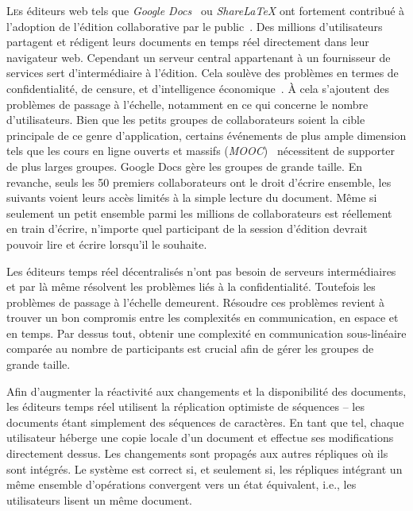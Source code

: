 
\lettrine{L}es éditeurs web tels que \emph{Google Docs}~\cite{googledocs} ou
\emph{ShareLaTeX}\cite{sharelatex} ont fortement contribué à l'adoption de
l'édition collaborative par le public~\cite{mogan2010impact}. Des millions
d'utilisateurs partagent et rédigent leurs documents en temps réel directement
dans leur navigateur web. Cependant un serveur central appartenant à un
fournisseur de services sert d'intermédiaire à l'édition. Cela soulève des
problèmes en termes de confidentialité, de censure, et d'intelligence
économique~\cite{cherrueau2016composer, gellman2013us, pearson2011toward}. À
cela s'ajoutent des problèmes de passage à l'échelle, notamment en ce qui
concerne le nombre d'utilisateurs. Bien que les petits groupes de collaborateurs
soient la cible principale de ce genre d'application, certains événements de
plus ample dimension tels que les cours en ligne ouverts et massifs
(\emph{MOOC})~\cite{breslow2013studying} nécessitent de supporter de plus larges
groupes. Google Docs gère les groupes de grande taille. En revanche, seuls les
50 premiers collaborateurs ont le droit d'écrire ensemble, les suivants voient
leurs accès limités à la simple lecture du document. Même si seulement un petit
ensemble parmi les millions de collaborateurs est réellement en train d'écrire,
n'importe quel participant de la session d'édition devrait pouvoir lire et
écrire lorsqu'il le souhaite.

Les éditeurs temps réel décentralisés n'ont pas besoin de serveurs
intermédiaires et par là même résolvent les problèmes liés à la
confidentialité. Toutefois les problèmes de passage à l'échelle
demeurent. Résoudre ces problèmes revient à trouver un bon compromis entre les
complexités en communication, en espace et en temps. Par dessus tout, obtenir une
complexité en communication sous-linéaire comparée au nombre de participants est
crucial afin de gérer les groupes de grande taille.

Afin d'augmenter la réactivité aux changements et la disponibilité des
documents, les éditeurs temps réel utilisent la réplication optimiste de
séquences -- les documents étant simplement des séquences de caractères. En tant
que tel, chaque utilisateur héberge une copie locale d'un document et effectue
ses modifications directement dessus. Les changements sont propagés aux autres
répliques où ils sont intégrés. Le système est correct si, et seulement si, les
répliques intégrant un même ensemble d'opérations convergent vers un état
équivalent, i.e., les utilisateurs lisent un même document.

